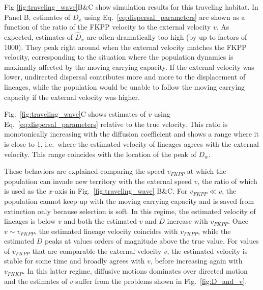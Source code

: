 \documentclass[aps,rmp, twocolumn]{revtex4}
\begin{document}
Fig \ref{fig:traveling_wave}B\&C show simulation results for this traveling habitat. In Panel B, estimates of $D_x$ using Eq.~\ref{eq:dispersal_parameters} are shown as a function of the ratio of the FKPP velocity to the external velocity $v$.
As expected, estimates of $\hat{D}_x$ are often dramatically too high (by up to factors of 1000).
They peak right around when the external velocity matches the FKPP velocity, corresponding to the situation where the population dynamics is maximally affected by the moving carrying capacity.
If the external velocity was lower, undirected dispersal contributes more and more to the displacement of lineages, while the population would be unable to follow the moving carrying capacity if the external velocity was higher.

Fig.~\ref{fig:traveling_wave}C shows estimates of $v$ using Eq.~\ref{eq:dispersal_parameters} relative to the true velocity.
This ratio is monotonically increasing with the diffusion coefficient and shows a range where it is close to 1, i.e.~where the estimated velocity of lineages agrees with the external velocity.
This range coincides with the location of the peak of $D_w$.

These behaviors are explained comparing the speed $v_{FKPP}$ at which the population can invade new territory with the external speed $v$, the ratio of which is used as the $x$-axis in Fig.~\ref{fig:traveling_wave} B\&C.
For $v_{FKPP} \ll v$, the population cannot keep up with the moving carrying capacity and is saved from extinction only because selection is soft.
In this regime, the estimated velocity of lineages is below $v$ and both the estimated $v$ and $D$ increase with $v_{FKPP}$.
Once $v\sim v_{FKPP}$, the estimated lineage velocity coincides with $v_{FKPP}$, while the estimated $D$ peaks at values orders of magnitude above the true value.
For values of $v_{FKPP}$ that are comparable the external velocity $v$, the estimated velocity is stable for some time and broadly agrees with $v$, before increasing again with $v_{FKKP}$.
In this latter regime, diffusive motions dominates over directed motion and the estimates of $v$ suffer from the problems shown in Fig.~\ref{fig:D_and_v}.
\end{document}
